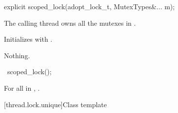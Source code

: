 %
\begin{itemdecl}
explicit scoped_lock(adopt_lock_t, MutexTypes&... m);
\end{itemdecl}

\begin{itemdescr}
\pnum
\expects
The calling thread owns all the mutexes in .

\pnum
\effects
Initializes  with .

\pnum
\throws
Nothing.
\end{itemdescr}

%
\begin{itemdecl}
~scoped_lock();
\end{itemdecl}

\begin{itemdescr}
\pnum
\effects
For all  in ,
.
\end{itemdescr}

[thread.lock.unique]{Class template }

